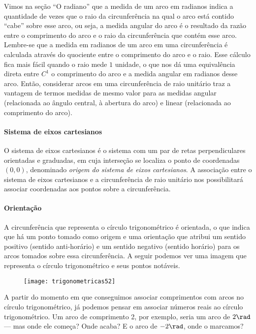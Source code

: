 Vimos na seção “O radiano”{} que a medida de um arco em radianos indica a quantidade de vezes que o raio da circunferência na qual o arco está contido “cabe”{} sobre esse arco, ou seja, a medida angular do arco é o resultado da razão entre o comprimento do arco e o raio da circunferência que contém esse arco. Lembre-se que a medida em radianos de um arco em uma circunferência é calculada através do quociente entre o comprimento do arco e o raio. Esse cálculo fica mais fácil quando o raio mede $1$ unidade, o que nos dá uma equivalência direta entre $C^1$ o comprimento do arco e a medida angular em radianos desse arco. Então, considerar arcos em uma circunferência de raio unitário traz a vantagem de termos medidas de mesmo valor para as medidas angular (relacionada ao ângulo central, à abertura do arco) e linear (relacionada ao comprimento do arco).

\paragraph{Sistema de eixos cartesianos}

O sistema de eixos cartesianos é o sistema com um par de retas perpendiculares orientadas e graduadas, em cuja interseção se localiza o ponto de coordenadas $(0,0)$, denominado \textit{origem do sistema de eixos cartesianos}. A associação entre o sistema de eixos cartesianos e a circunferência de raio unitário nos possibilitará associar coordenadas aos pontos sobre a circunferência.

\paragraph{Orientação}

A circunferência que representa o círculo trigonométrico é orientada, o que indica que há um ponto tomado como origem e uma orientação que atribui um sentido positivo (sentido anti-horário) e um sentido negativo (sentido horário) para os arcos tomados sobre essa circunferência. A seguir podemos ver uma imagem que representa o círculo trigonométrico e seus pontos notáveis.

\begin{figure}[H]
\centering

\texttt{[image: trigonometricas52]}
\end{figure}

A partir do momento em que conseguimos associar comprimentos com arcos no círculo trigonométrico, já podemos pensar em associar números reais ao círculo trigonométrico. Um arco de comprimento 2, por exemplo, seria um arco de $2 \rad$ --- mas onde ele começa? Onde acaba? E o arco de $-2\rad$, onde o marcamos?


